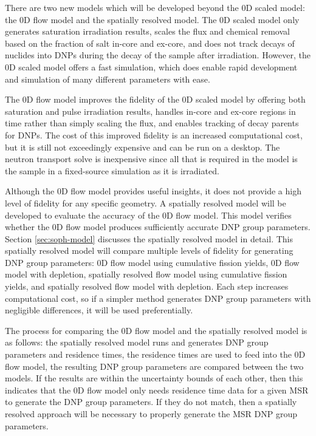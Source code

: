 There are two new models which will be developed beyond the 0D scaled model: the 0D flow model and the spatially resolved model.
The 0D scaled model only generates saturation irradiation results, scales the flux and chemical removal based on the fraction of salt in-core and ex-core, and does not track decays of nuclides into \glspl{DNP} during the decay of the sample after irradiation.
However, the 0D scaled model offers a fast simulation, which does enable rapid development and simulation of many different parameters with ease.

The 0D flow model improves the fidelity of the 0D scaled model by offering both saturation and pulse irradiation results, handles in-core and ex-core regions in time rather than simply scaling the flux, and enables tracking of decay parents for \glspl{DNP}.
The cost of this improved fidelity is an increased computational cost, but it is still not exceedingly expensive and can be run on a desktop.
The neutron transport solve is inexpensive since all that is required in the model is the sample in a fixed-source simulation as it is irradiated.

Although the 0D flow model provides useful insights, it does not provide a high level of fidelity for any specific geometry.
A spatially resolved model will be developed to evaluate the accuracy of the 0D flow model.
This model verifies whether the 0D flow model produces sufficiently accurate \gls{DNP} group parameters.
Section \ref{sec:soph-model} discusses the spatially resolved model in detail.
This spatially resolved model will compare multiple levels of fidelity for generating \gls{DNP} group parameters: 0D flow model using cumulative fission yields, 0D flow model with depletion, spatially resolved flow model using cumulative fission yields, and spatially resolved flow model with depletion.
Each step increases computational cost, so if a simpler method generates \gls{DNP} group parameters with negligible differences, it will be used preferentially.

The process for comparing the 0D flow model and the spatially resolved model is as follows: the spatially resolved model runs and generates \gls{DNP} group parameters and residence times, the residence times are used to feed into the 0D flow model, the resulting \gls{DNP} group parameters are compared between the two models.
If the results are within the uncertainty bounds of each other, then this indicates that the 0D flow model only needs residence time data for a given \gls{MSR} to generate the \gls{DNP} group parameters.
If they do not match, then a spatially resolved approach will be necessary to properly generate the \gls{MSR} \gls{DNP} group parameters.